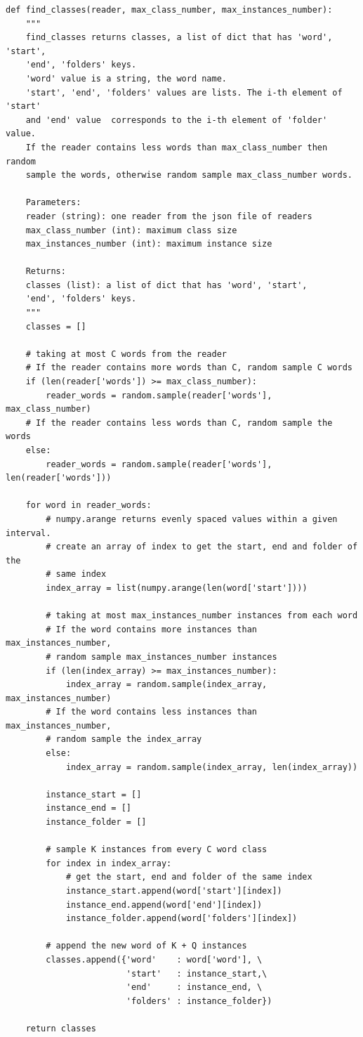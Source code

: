 \documentclass[12pt,a4paper,titlepage]{article}
\begin{document}
\begin{lstlisting}[language=iPython,firstnumber=100, caption=Funzione \texttt{find\_classes}, label=find_classes,captionpos=b]
def find_classes(reader, max_class_number, max_instances_number):
    """
    find_classes returns classes, a list of dict that has 'word', 'start',
    'end', 'folders' keys.
    'word' value is a string, the word name.
    'start', 'end', 'folders' values are lists. The i-th element of 'start' 
    and 'end' value  corresponds to the i-th element of 'folder' value.
    If the reader contains less words than max_class_number then random 
    sample the words, otherwise random sample max_class_number words.

    Parameters:
    reader (string): one reader from the json file of readers 
    max_class_number (int): maximum class size
    max_instances_number (int): maximum instance size

    Returns:
    classes (list): a list of dict that has 'word', 'start',
    'end', 'folders' keys.
    """
    classes = []

    # taking at most C words from the reader
    # If the reader contains more words than C, random sample C words
    if (len(reader['words']) >= max_class_number):
        reader_words = random.sample(reader['words'], max_class_number)
    # If the reader contains less words than C, random sample the words
    else:
        reader_words = random.sample(reader['words'], len(reader['words']))  

    for word in reader_words:
        # numpy.arange returns evenly spaced values within a given interval.
        # create an array of index to get the start, end and folder of the
        # same index
        index_array = list(numpy.arange(len(word['start'])))
        
        # taking at most max_instances_number instances from each word
        # If the word contains more instances than max_instances_number,
        # random sample max_instances_number instances
        if (len(index_array) >= max_instances_number):
            index_array = random.sample(index_array, max_instances_number)
        # If the word contains less instances than max_instances_number,
        # random sample the index_array
        else:
            index_array = random.sample(index_array, len(index_array))  

        instance_start = []
        instance_end = []
        instance_folder = []
        
        # sample K instances from every C word class
        for index in index_array:
            # get the start, end and folder of the same index
            instance_start.append(word['start'][index])
            instance_end.append(word['end'][index])
            instance_folder.append(word['folders'][index])

        # append the new word of K + Q instances
        classes.append({'word'    : word['word'], \
                        'start'   : instance_start,\
                        'end'     : instance_end, \
                        'folders' : instance_folder})

    return classes
\end{lstlisting}
\end{document}
